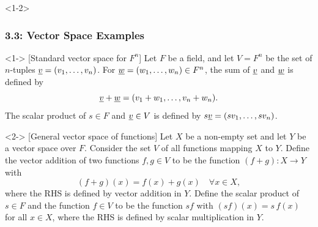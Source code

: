 \documentclass[10pt,english,aspectratio=169]{beamer}
\begin{document}
\begin{frame}<1-2> \frametitle{3.3: Vector Space Examples}

\begin{example}<1-> [Standard vector space for $F^n$]
Let $F$ be a field, and let $V=F^n$ be the set of $n$-tuples $\underline{v} = (v_1, \ldots, v_n)$.
For $\underline{w} = (w_1, \ldots, w_n) \in F^n$, the sum of $\underline{v}$ and $\underline{w}$ is defined by \vspace{-1mm}
\begin{equation*}
\underline{v} + \underline{w} = (v_1 + w_1, \ldots, v_n + w_n).
\end{equation*}
The scalar product of $s \in F$ and $\underline{v} \in V$ is defined by $s \underline{v} = (s v_1, \ldots, s v_n)$.
\end{example}

\begin{example}<2-> [General vector space of functions]
Let $X$ be a non-empty set and let $Y$ be a vector space over $F$.
Consider the set $V$ of all functions mapping $X$ to $Y$.
Define the vector addition of two functions $f,g \in V$ to be the function $(f+g)\colon X \to Y$ with  \vspace{-1mm}
\begin{equation*}
(f + g)(x) = f(x) + g(x) \quad \forall x \in X,
\end{equation*}
where the RHS is defined by vector addition in $Y$.
Define the scalar product of $s \in F$ and the function $f \in V$  to be the function $sf$ with
$(sf)(x) = s \, f(x)$ for all $x \in X$,
where the RHS is defined by scalar multiplication in $Y$.
\vspace{-1mm}
\end{example}


\end{frame}
\end{document}

